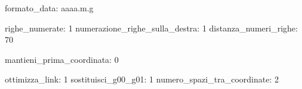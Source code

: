 formato_data: aaaa.m.g

righe_numerate:                 1
numerazione_righe_sulla_destra: 1
distanza_numeri_righe:          70

mantieni_prima_coordinata:      0

ottimizza_link:              1
sostituisci_g00_g01:         1
numero_spazi_tra_coordinate: 2
